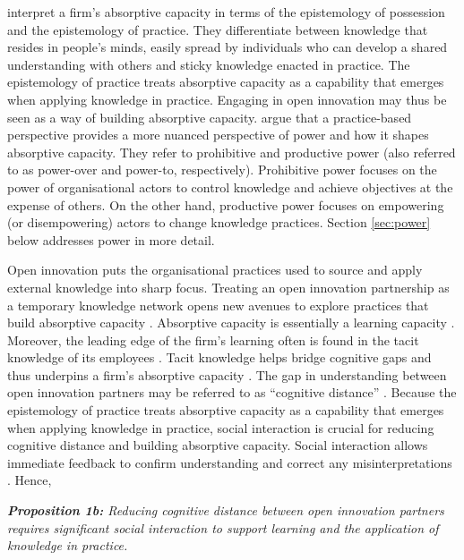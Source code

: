 \citet{marabelli2014knowing} interpret a firm's absorptive capacity in terms of the epistemology of possession and the epistemology of practice. They differentiate between knowledge that resides in people's minds, easily spread by individuals who can develop a shared understanding with others and sticky knowledge enacted in practice. The epistemology of practice treats absorptive capacity as a capability that emerges when applying knowledge in practice. Engaging in open innovation may thus be seen as a way of building absorptive capacity. \citet{marabelli2014knowing} argue that a practice-based perspective provides a more nuanced perspective of power and how it shapes absorptive capacity. They refer to prohibitive and productive power (also referred to as power-over and power-to, respectively). Prohibitive power focuses on the power of organisational actors to control knowledge and achieve objectives at the expense of others. On the other hand, productive power focuses on empowering (or disempowering) actors to change knowledge practices. Section \ref{sec:power} below addresses power in more detail. \medskip

Open innovation puts the organisational practices used to source and apply external knowledge into sharp focus. Treating an open innovation partnership as a temporary knowledge network opens new avenues to explore practices that build absorptive capacity \citep{vanhaverbeke2007connecting,xia2016unpacking}. Absorptive capacity is essentially a learning capacity \citep{cohen1989innovation, cohen1990absorptive, nooteboom2000learning, lichtenthaler2009absorptive, sun2010examination,knoppen2022absorptive}. Moreover, the leading edge of the firm's learning often is found in the tacit knowledge of its employees \citep{horvath2000working}. Tacit knowledge helps bridge cognitive gaps and thus underpins a firm's absorptive capacity \citep{thomas2021tacit}. The gap in understanding between open innovation partners may be referred to as \enquote{cognitive distance} \citep{nooteboom2000learning,nooteboom2007optimal}. Because the epistemology of practice treats absorptive capacity as a capability that emerges when applying knowledge in practice, social interaction is crucial for reducing cognitive distance and building absorptive capacity. Social interaction allows immediate feedback to confirm understanding and correct any misinterpretations \citep{haldin2000difficulties,gertler2003tacit,koskinen2003tacit}. Hence, \bigskip

\begin{tcolorbox}
\textit{\textbf{Proposition 1b:} Reducing cognitive distance between open innovation partners requires significant social interaction to support learning and the application of knowledge in practice.}
\end{tcolorbox}

